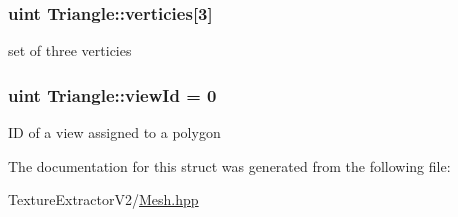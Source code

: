 \subsubsection[{verticies}]{\setlength{\rightskip}{0pt plus 5cm}uint Triangle\+::verticies\mbox{[}3\mbox{]}}\label{struct_triangle_ae6371f947daaa0debff04c10b6fadf74}
set of three verticies \hypertarget{struct_triangle_a18682ece909b0d90107ac391f37f5cd4}{}
\subsubsection[{view\+Id}]{\setlength{\rightskip}{0pt plus 5cm}uint Triangle\+::view\+Id = 0}\label{struct_triangle_a18682ece909b0d90107ac391f37f5cd4}
I\+D of a view assigned to a polygon 

The documentation for this struct was generated from the following file\+:\begin{DoxyCompactItemize}
\item 
Texture\+Extractor\+V2/\hyperlink{_mesh_8hpp}{Mesh.\+hpp}\end{DoxyCompactItemize}

